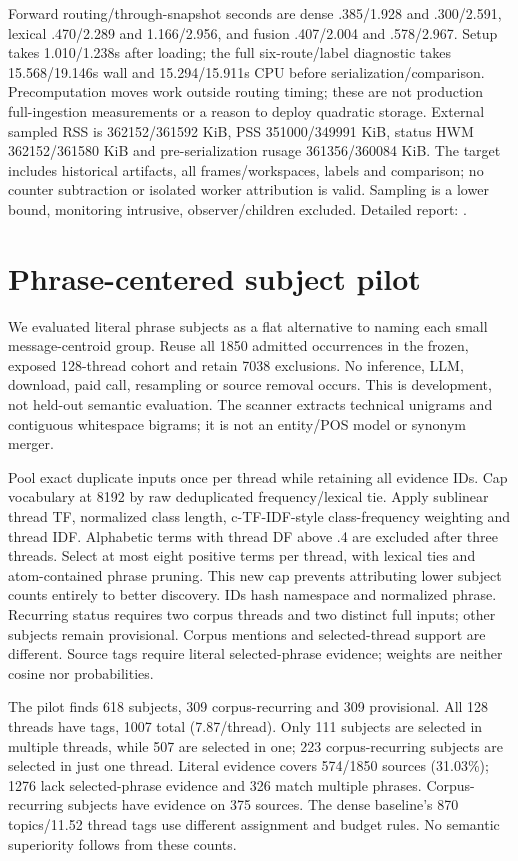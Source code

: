 \documentclass[11pt]{article}
\begin{document}
Forward routing/through-snapshot seconds are dense .385/1.928 and .300/2.591,
lexical .470/2.289 and 1.166/2.956, and fusion .407/2.004 and .578/2.967.
Setup takes 1.010/1.238s after loading; the full six-route/label diagnostic takes
15.568/19.146s wall and 15.294/15.911s CPU before serialization/comparison.
Precomputation moves work outside routing timing; these are not production
full-ingestion measurements or a reason to deploy quadratic storage. External
sampled RSS is 362152/361592 KiB, PSS 351000/349991 KiB, status HWM
362152/361580 KiB and pre-serialization rusage 361356/360084 KiB. The target
includes historical artifacts, all frames/workspaces, labels and comparison;
no counter subtraction or isolated worker attribution is valid. Sampling is a
lower bound, monitoring intrusive, observer/children excluded. Detailed report:
.

\section{Phrase-centered subject pilot}
We evaluated literal phrase subjects as a flat alternative to naming each small
message-centroid group. Reuse all 1850 admitted occurrences in the frozen,
exposed 128-thread cohort and retain 7038 exclusions. No inference, LLM,
download, paid call, resampling or source removal occurs. This is development,
not held-out semantic evaluation. The scanner extracts technical unigrams and
contiguous whitespace bigrams; it is not an entity/POS model or synonym merger.

Pool exact duplicate inputs once per thread while retaining all evidence IDs.
Cap vocabulary at 8192 by raw deduplicated frequency/lexical tie. Apply sublinear
thread TF, normalized class length, c-TF-IDF-style class-frequency weighting
\cite{bertopic} and thread IDF. Alphabetic terms with thread DF above .4 are
excluded after three threads. Select at most eight positive terms per thread,
with lexical ties and atom-contained phrase pruning. This new cap prevents
attributing lower subject counts entirely to better discovery. IDs hash namespace
and normalized phrase. Recurring status requires two corpus threads and two
distinct full inputs; other subjects remain provisional. Corpus mentions and
selected-thread support are different. Source tags require literal selected-phrase
evidence; weights are neither cosine nor probabilities.

The pilot finds 618 subjects, 309 corpus-recurring and 309 provisional. All
128 threads have tags, 1007 total (7.87/thread). Only 111 subjects are selected
in multiple threads, while 507 are selected in one; 223 corpus-recurring subjects
are selected in just one thread. Literal evidence covers 574/1850 sources
(31.03\%); 1276 lack selected-phrase evidence and 326 match multiple phrases.
Corpus-recurring subjects have evidence on 375 sources. The dense baseline's
870 topics/11.52 thread tags use different assignment and budget rules. No
semantic superiority follows from these counts.
\end{document}
